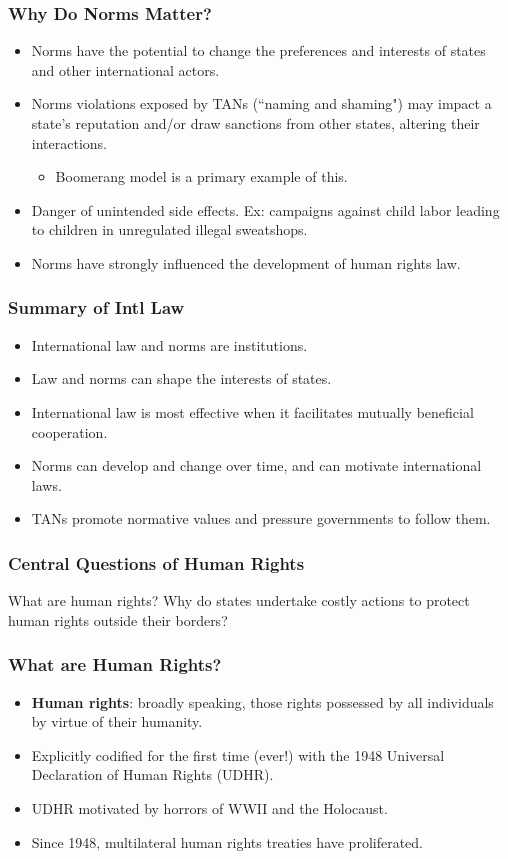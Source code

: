 \documentclass[handout]{beamer}
\begin{document}
\begin{frame} 
	\frametitle{\LARGE{Why Do Norms Matter?}}
	\begin{itemize}
		\item Norms have the potential to change the preferences and interests of states and other international actors. \pause
		\item Norms violations exposed by TANs (``naming and shaming") may impact a state's reputation and/or draw sanctions from other states, altering their interactions.
		\begin{itemize}
			\item Boomerang model is a primary example of this. \pause
		\end{itemize}
		\item Danger of unintended side effects. Ex: campaigns against child labor leading to children in unregulated illegal sweatshops.
		\item Norms have strongly influenced the development of human rights law.
	\end{itemize}
\end{frame}

\begin{frame} 
	\frametitle{\LARGE{Summary of Intl Law}}
	\begin{itemize}
		\item International law and norms are institutions.
		\item Law and norms can shape the interests of states.
		\item International law is most effective when it facilitates mutually beneficial cooperation.
		\item Norms can develop and change over time, and can motivate international laws.
		\item TANs promote normative values and pressure governments to follow them.	
	\end{itemize}
\end{frame}

\begin{frame} 
	\frametitle{\LARGE{Central Questions of Human Rights}}
	\centering
	\Large{What are human rights? Why do states undertake costly actions to protect human rights outside their borders?}
\end{frame}

\begin{frame} 
	\frametitle{\LARGE{What are Human Rights?}}
	\begin{itemize}
		\item \textbf{Human rights}: broadly speaking, those rights possessed by all individuals by virtue of their humanity. \pause
		
		\item Explicitly codified for the first time (ever!) with the 1948 Universal Declaration of Human Rights (UDHR). \pause
		\item UDHR motivated by horrors of WWII and the Holocaust.
		\item Since 1948, multilateral human rights treaties have proliferated.
		
	\end{itemize}
\end{frame}
\end{document}
